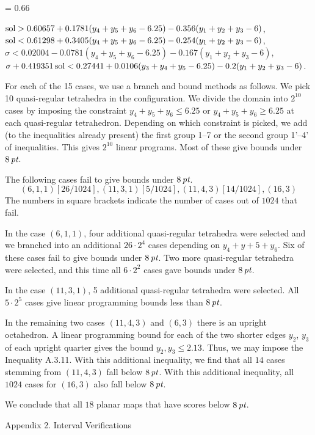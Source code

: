 {
\baselineskip = 0.66\baselineskip
\obeylines
\parskip=0pt
 
\hbox{}

 $\operatorname{sol} >0.60657 + 0.1781 (y_4+y_5+y_6-6.25)-0.356(y_1+y_2+y_3-6)$,
 $\operatorname{sol}< 0.61298 + 0.3405 (y_4+y_5+y_6-6.25)-0.254(y_1+y_2+y_3-6)$,
 $\sigma< 0.02004 -0.0781 (y_4+y_5+y_6-6.25)-0.167(y_1+y_2+y_3-6)$,
 $\sigma+0.419351\operatorname{sol}< 0.27441+0.0106(y_3+y_4+y_5-6.25)-0.2(y_1+y_2+y_3-6)$.

}

For each of the 15 cases, we use a branch and bound methods
as follows.  We pick 10 quasi-regular
tetrahedra in the configuration.  We divide the domain into $2^{10}$
cases by imposing the constraint $y_4+y_5+y_6\le6.25$ or $y_4+y_5+y_6\ge6.25$
at each quasi-regular tetrahedron.  Depending on which constraint
is picked, we add (to the inequalities already present)
the first group 1--7 or the second group 1'--4'
of inequalities. This gives $2^{10}$ linear programs.  Most of these
give bounds under $8\,\hbox{\it pt}$.

The following cases fail to give bounds under $8\,\hbox{\it pt}$.
$$
(6,1,1) [26/1024], (11,3,1) [5/1024], (11,4,3) [14/1024], (16,3)
$$
The numbers in square brackets indicate the number of cases out of
$1024$ that fail.

\bigskip
In the case $(6,1,1)$, four additional quasi-regular tetrahedra
were selected and we branched into an additional $26\cdot 2^4$
cases depending on $y_4+y+5+y_6$.  Six of these cases fail to
give bounds under $8\,\hbox{\it pt}$.  Two more quasi-regular tetrahedra were
selected, and this time all $6\cdot 2^2$ cases gave bounds under
$8\,\hbox{\it pt}$.

In the case $(11,3,1)$, 5 additional quasi-regular tetrahedra
were selected.  All $5\cdot 2^5$ cases give linear programming bounds
less than $8\,\hbox{\it pt}$.

In the remaining two cases $(11,4,3)$ and $(6,3)$ there is an upright
octahedron.  A linear programming bound for each of the two
shorter edges $y_2$, $y_3$ of each upright quarter gives the bound
$y_2,y_3\le 2.13$.  Thus, we may impose the Inequality A.3.11.
With this additional inequality, we find that all $14$ cases
stemming from $(11,4,3)$ fall below $8\,\hbox{\it pt}$.  With this additional
inequality, all $1024$ cases for $(16,3)$ also fall below $8\,\hbox{\it pt}$.

We conclude that all $18$ planar maps that have scores below $8\,\hbox{\it pt}$.


\newpage
\head Appendix 2. Interval Verifications\endhead


